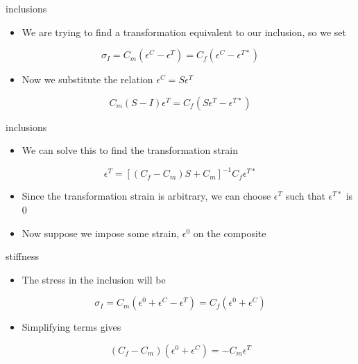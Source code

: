 \documentclass[
  letterpaper,
  ignorenonframetext,
  aspectratio=43,
  handout,
  12pt]{beamer}
\providecommand{\tightlist}{%
  \setlength{\itemsep}{0pt}\setlength{\parskip}{0pt}}
\providecommand{\tightlist}{%
\setlength{\itemsep}{0pt}\setlength{\parskip}{0pt}}
\begin{document}
\begin{frame}{inclusions}
\protect\hypertarget{inclusions-1}{}
\begin{itemize}
\tightlist
\item
  We are trying to find a transformation equivalent to our inclusion, so
  we set
\end{itemize}

\[\sigma_I = C_m(\epsilon^C - \epsilon^T) = C_f(\epsilon^C-\epsilon^{T*})\]

\begin{itemize}
\tightlist
\item
  Now we substitute the relation \(\epsilon^C = S\epsilon^T\)
\end{itemize}

\[C_m(S - I)\epsilon^T = C_f(S \epsilon^T-\epsilon^{T*})\]
\end{frame}

\begin{frame}{inclusions}
\protect\hypertarget{inclusions-2}{}
\begin{itemize}
\tightlist
\item
  We can solve this to find the transformation strain
\end{itemize}

\[\epsilon^T = \left [ (C_f - C_m)S + C_m\right]^{-1} C_f \epsilon^{T*}\]

\begin{itemize}
\tightlist
\item
  Since the transformation strain is arbitrary, we can choose
  \(\epsilon^T\) such that \(\epsilon^{T*}\) is 0
\item
  Now suppose we impose some strain, \(\epsilon^0\) on the composite
\end{itemize}
\end{frame}

\begin{frame}{stiffness}
\protect\hypertarget{stiffness}{}
\begin{itemize}
\tightlist
\item
  The stress in the inclusion will be
\end{itemize}

\[\sigma_I = C_m (\epsilon^0 + \epsilon^C - \epsilon^T) = C_f (\epsilon^0 + \epsilon^C)\]

\begin{itemize}
\tightlist
\item
  Simplifying terms gives
\end{itemize}

\[\left ( C_f - C_m \right ) \left ( \epsilon^0 + \epsilon^C \right) = -C_m \epsilon^T\]
\end{frame}
\end{document}
